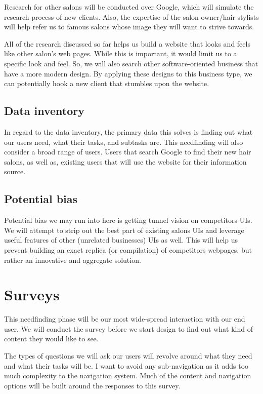 Research for other salons will be conducted over Google, which will simulate the research process of new clients. Also, the expertise of the salon owner/hair stylists will help refer us to famous salons whose image they will want to strive towards.

All of the research discussed so far helps us build a website that looks and feels like other salon's web pages. While this is important, it would limit us to a specific look and feel. So, we will also search other software-oriented business that have a more modern design. By applying these designs to this business type, we can potentially hook a new client that stumbles upon the website.

\subsection{Data inventory}
In regard to the data inventory, the primary data this solves is finding out what our users need, what their tasks, and subtasks are. This needfinding will also consider a broad range of users. Users that search Google to find their new hair salons, as well as, existing users that will use the website for their information source.

\subsection{Potential bias}
Potential bias we may run into here is getting tunnel vision on competitors UIs. We will attempt to strip out the best part of existing salons UIs and leverage useful features of other (unrelated businesses) UIs as well. This will help us prevent building an exact replica (or compilation) of competitors webpages, but rather an innovative and aggregate solution.

\section{Surveys}

This needfinding phase will be our most wide-spread interaction with our end user. We will conduct the survey before we start design to find out what kind of content they would like to see.

The types of questions we will ask our users will revolve around what they need and what their tasks will be. I want to avoid any sub-navigation as it adds too much complexity to the navigation system. Much of the content and navigation options will be built around the responses to this survey.

